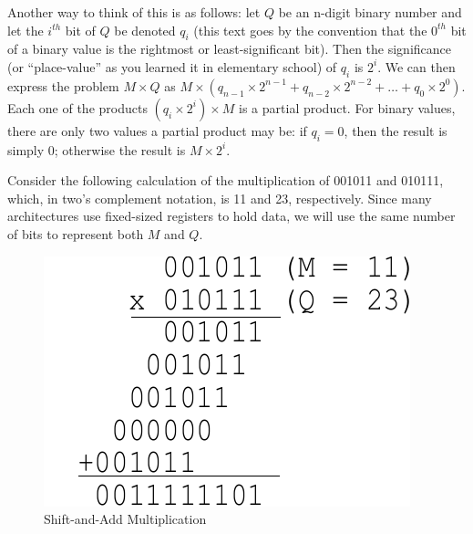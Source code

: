 \documentclass{article}
\begin{document}

Another way to think of this is as follows: let $Q$ be an n-digit binary number and let the $i^{th}$ bit of $Q$ be denoted $q_i$ (this text goes by the convention that the $0^{th}$ bit of a binary value is the rightmost or least-significant bit).
Then the significance (or ``place-value'' as you learned it in elementary school) of $q_i$ is $2^i$.
We can then express the problem $M \times Q$ as $M \times (q_{n-1} \times 2^{n-1} + q_{n-2} \times 2^{n-2} + \ldots + q_{0} \times 2^{0})$.
Each one of the products $(q_i \times 2^{i}) \times M$ is a partial product.
For binary values, there are only two values a partial product may be: if $q_i = 0$, then the result is simply $0$; otherwise the result is $M \times 2^i$.

Consider the following calculation of the multiplication of 001011 and 010111, which, in two's complement notation, is 11 and 23, respectively.
Since many architectures use fixed-sized registers to hold data, we will use the same number of bits to represent both $M$ and $Q$.
\pagebreak
\begin{figure}
\centering
\includegraphics[scale=0.7]{saam3.pdf}
\caption{Shift-and-Add Multiplication}
\end{figure}
\end{document}
